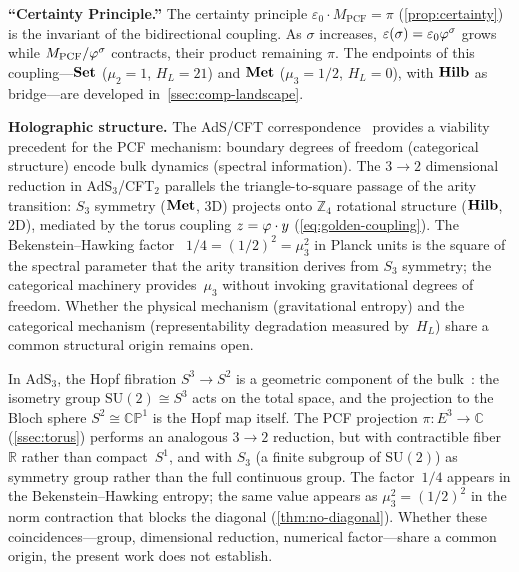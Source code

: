 \smallskip\noindent\textbf{``Certainty Principle.''}
The certainty principle $\varepsilon_0\cdot M_{\mathrm{PCF}}=\pi$
(\cref{prop:certainty}) is the invariant of the bidirectional
coupling.  As $\sigma$ increases,
$\varepsilon(\sigma)=\varepsilon_0\varphi^\sigma$ grows while
$M_{\mathrm{PCF}}/\varphi^\sigma$ contracts, their product remaining
$\pi$.  The endpoints of this coupling---$\mathbf{Set}$ ($\mu_2=1$, $H_L=21$)
and $\mathbf{Met}$ ($\mu_3=1/2$, $H_L=0$), with $\mathbf{Hilb}$ as
bridge---are developed in~\cref{ssec:comp-landscape}.

\smallskip\noindent\textbf{Holographic structure.}
The AdS/CFT correspondence~\cite{maldacena98,hubeny15} provides a
viability precedent for the PCF mechanism: boundary degrees of freedom
(categorical structure) encode bulk dynamics (spectral information).
The $3\to 2$ dimensional reduction in AdS$_3$/CFT$_2$ parallels the
triangle-to-square passage of the arity transition: $S_3$ symmetry
($\mathbf{Met}$, 3D) projects onto $\mathbb{Z}_4$ rotational structure
($\mathbf{Hilb}$, 2D), mediated by the torus coupling $z=\varphi\cdot y$
(\cref{eq:golden-coupling}).  The Bekenstein--Hawking
factor~\cite{bekenstein73,hawking75} $1/4 = (1/2)^2 = \mu_3^2$ in Planck units is
the square of the spectral parameter that the arity transition derives
from $S_3$ symmetry; the categorical machinery provides~$\mu_3$ without
invoking gravitational degrees of freedom.  Whether the physical
mechanism (gravitational entropy) and the categorical mechanism
(representability degradation measured by~$H_L$) share a common
structural origin remains open.

In $\mathrm{AdS}_3$, the Hopf fibration $S^3\to S^2$ is a geometric
component of the bulk~\cite{urbantke03,mosseri01}: the isometry group
$\mathrm{SU}(2)\cong S^3$ acts on the total space, and the projection
to the Bloch sphere $S^2\cong\mathbb{CP}^1$ is the Hopf map itself.
The PCF projection $\pi\colon E^3\to\mathbb{C}$
(\cref{ssec:torus}) performs an analogous $3\to 2$ reduction, but
with contractible fiber~$\mathbb{R}$ rather than compact~$S^1$, and
with $S_3$ (a finite subgroup of $\mathrm{SU}(2)$) as symmetry group
rather than the full continuous group.  The factor~$1/4$ appears in the
Bekenstein--Hawking entropy; the same value appears as
$\mu_3^2=(1/2)^2$ in the norm contraction that blocks the diagonal
(\cref{thm:no-diagonal}).  Whether these
coincidences---group, dimensional reduction, numerical
factor---share a common origin, the present work does not establish.

